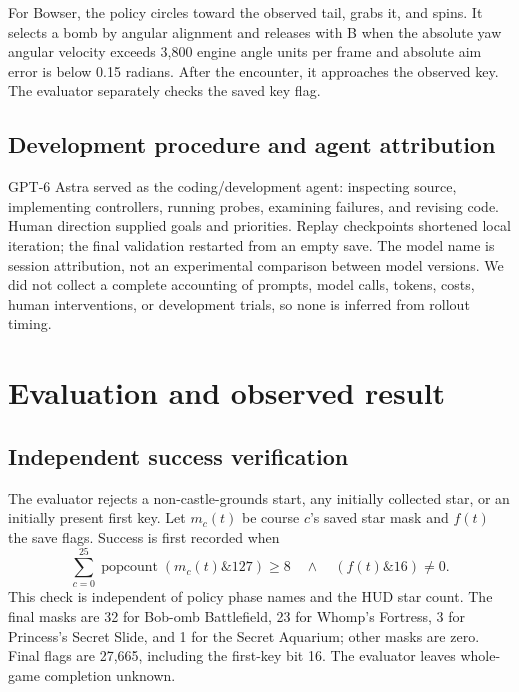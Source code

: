\documentclass[10pt,letterpaper]{article}
\newcommand{\popcount}{\operatorname{popcount}}
\begin{document}
For Bowser, the policy circles toward the observed tail, grabs it, and spins. It selects a bomb by angular alignment and releases with B when the absolute yaw angular velocity exceeds 3,800 engine angle units per frame and absolute aim error is below 0.15 radians. After the encounter, it approaches the observed key. The evaluator separately checks the saved key flag.

\subsection{Development procedure and agent attribution}
GPT-6 Astra served as the coding/development agent: inspecting source, implementing controllers, running probes, examining failures, and revising code. Human direction supplied goals and priorities. Replay checkpoints shortened local iteration; the final validation restarted from an empty save. The model name is session attribution, not an experimental comparison between model versions. We did not collect a complete accounting of prompts, model calls, tokens, costs, human interventions, or development trials, so none is inferred from rollout timing.

\clearpage
\section{Evaluation and observed result}
\subsection{Independent success verification}
The evaluator rejects a non-castle-grounds start, any initially collected star, or an initially present first key. Let $m_c(t)$ be course $c$'s saved star mask and $f(t)$ the save flags. Success is first recorded when
\begin{equation}
 \sum_{c=0}^{25}\popcount(m_c(t)\mathbin{\&}127)\geq8
 \quad\land\quad (f(t)\mathbin{\&}16)\ne0.
\end{equation}
This check is independent of policy phase names and the HUD star count. The final masks are 32 for Bob-omb Battlefield, 23 for Whomp's Fortress, 3 for Princess's Secret Slide, and 1 for the Secret Aquarium; other masks are zero. Final flags are 27,665, including the first-key bit 16. The evaluator leaves whole-game completion unknown.
\end{document}
